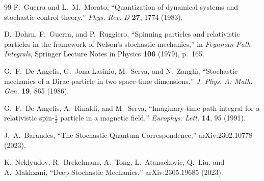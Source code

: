 \documentclass[11pt]{article}
\begin{document}
\begin{thebibliography}{99}
 F.~Guerra and L.~M.~Morato, ``Quantization of dynamical systems and stochastic control theory,'' \emph{Phys. Rev. D} \textbf{27}, 1774 (1983).

 D.~Dohrn, F.~Guerra, and P.~Ruggiero, ``Spinning particles and relativistic particles in the framework of Nelson's stochastic mechanics,'' in \emph{Feynman Path Integrals}, Springer Lecture Notes in Physics \textbf{106} (1979), p.~165.

 G.~F.~De Angelis, G.~Jona-Lasinio, M.~Serva, and N.~Zangh\`{\i}, ``Stochastic mechanics of a Dirac particle in two space-time dimensions,'' \emph{J. Phys. A: Math. Gen.} \textbf{19}, 865 (1986).

 G.~F.~De Angelis, A.~Rinaldi, and M.~Serva, ``Imaginary-time path integral for a relativistic spin-$\tfrac12$ particle in a magnetic field,'' \emph{Europhys. Lett.} \textbf{14}, 95 (1991).

 J.~A.~Barandes, ``The Stochastic-Quantum Correspondence,'' arXiv:2302.10778 (2023).

 K.~Neklyudov, R.~Brekelmans, A.~Tong, L.~Atanackovic, Q.~Liu, and A.~Makhzani, ``Deep Stochastic Mechanics,'' arXiv:2305.19685 (2023).

\end{thebibliography}
\end{document}
